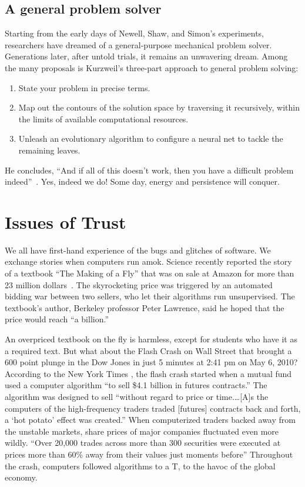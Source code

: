 \documentclass{llncs}
\begin{document}
\subsection{A general problem solver}

Starting from the early days of Newell, Shaw, and Simon's experiments, researchers
have dreamed of a general-purpose mechanical problem solver.  Generations later,
after untold trials, it remains an unwavering dream.  Among the many
proposals is Kurzweil's three-part approach to general problem solving:
\begin{enumerate} 
\item State your problem in precise terms.
\item Map out the contours of the solution space by traversing it
  recursively, within the limits of available computational resources.
\item Unleash an evolutionary algorithm to configure a neural net to
  tackle the remaining leaves.
\end{enumerate}
He concludes, ``And if all of this doesn't work, then you have a
difficult problem indeed''~\cite{Ku99}.  Yes, indeed we do!  Some day,
energy and persistence will conquer.



\newpage
\section{Issues of Trust}\label{sec:trust}

We all have first-hand experience of the bugs and glitches of
software.  We exchange stories when computers run amok.  Science
recently reported the story of a textbook ``The Making of a Fly'' that
was on sale at Amazon for more than 23 million dollars~\cite{Sci11}.  The
skyrocketing price was triggered by an automated bidding war between
two sellers, who let their algorithms run unsupervised.  The textbook's author,
Berkeley professor Peter Lawrence, said he hoped that the price would
reach ``a billion.''


An overpriced textbook on the fly is harmless, except for students who
have it as a required text.  But what about the Flash Crash on Wall
Street that brought a 600 point plunge in the Dow Jones in just 5
minutes at 2:41 pm on May 6, 2010?  According to the New York Times \cite{NYT2010}, the flash
crash started when a mutual fund used a computer algorithm ``to sell
\$4.1 billion in futures contracts.''  The algorithm was designed to
sell ``without regard to price or time.\dots [A]s the computers of the
high-frequency traders traded [futures] contracts back and forth, a
`hot potato' effect was created.''  When computerized traders backed
away from the unstable markets, share prices of major companies
fluctuated even more wildly. ``Over 20,000 trades across more than 300
securities were executed at prices more than 60\% away from their
values just moments before'' \cite{SEC2010} Throughout the crash,
computers followed algorithms to a T, to the havoc
of the global economy. 
\end{document}
